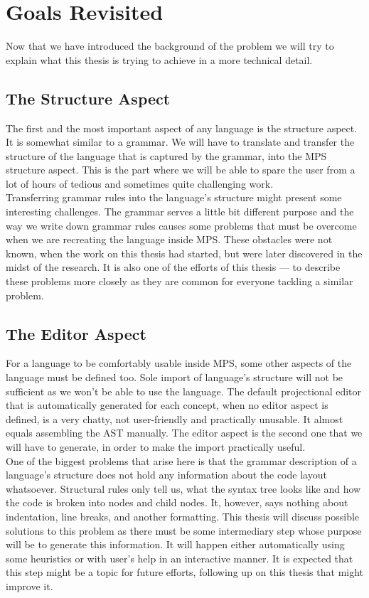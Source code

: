 \chapter{Goals Revisited}

Now that we have introduced the background of the problem we will try to explain what this thesis is trying to achieve in a more technical detail.

\section{The Structure Aspect}
The first and the most important aspect of any language is the structure aspect.
It is somewhat similar to a grammar.
We will have to translate and transfer the structure of the language that is captured by the grammar, into the MPS structure aspect.
This is the part where we will be able to spare the user from a lot of hours of tedious and sometimes quite challenging work.
\\

Transferring grammar rules into the language's structure might present some interesting challenges.
The grammar serves a little bit different purpose and the way we write down grammar rules causes some problems that must be overcome when we are recreating the language inside MPS.
These obstacles were not known, when the work on this thesis had started, but were later discovered in the midst of the research.
It is also one of the efforts of this thesis --- to describe these problems more closely as they are common for everyone tackling a similar problem.

\section{The Editor Aspect}
For a language to be comfortably usable inside MPS, some other aspects of the language must be defined too.
Sole import of language's structure will not be sufficient as we won't be able to use the language.
The default projectional editor that is automatically generated for each concept, when no editor aspect is defined, is a very chatty, not user-friendly and practically unusable.
It almost equals assembling the AST manually.
The editor aspect is the second one that we will have to generate, in order to make the import practically useful.
\\

One of the biggest problems that arise here is that the grammar description of a language's structure does not hold any information about the code layout whatsoever.
Structural rules only tell us, what the syntax tree looks like and how the code is broken into nodes and child nodes.
It, however, says nothing about indentation, line breaks, and another formatting.
This thesis will discuss possible solutions to this problem as there must be some intermediary step whose purpose will be to generate this information.
It will happen either automatically using some heuristics or with user's help in an interactive manner.
It is expected that this step might be a topic for future efforts, following up on this thesis that might improve it.

